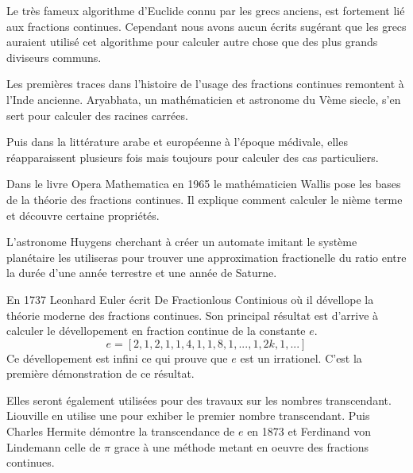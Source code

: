 Le très fameux algorithme d'Euclide connu par les grecs anciens, est fortement lié aux fractions continues. Cependant nous avons aucun écrits sugérant que les grecs auraient utilisé cet algorithme pour calculer autre chose que des plus grands diviseurs communs.\newline

Les premières traces dans l'histoire de l'usage des fractions continues remontent à l'Inde ancienne. Aryabhata, un mathématicien et astronome du Vème siecle, s'en sert pour calculer des racines carrées.\newline

Puis dans la littérature arabe et européenne à l'époque médivale, elles réapparaissent plusieurs fois mais toujours pour calculer des cas particuliers.\newline

Dans le livre Opera Mathematica en 1965 le mathématicien Wallis pose les bases de la théorie des fractions continues. Il explique comment calculer le nième terme et découvre certaine propriétés.\newline

L'astronome Huygens cherchant à créer un automate imitant le système planétaire les utiliseras pour trouver une approximation fractionelle du ratio entre la durée d'une année terrestre et une année de Saturne.\newline

En 1737 Leonhard Euler écrit De Fractionlous Continious où il dévellope la théorie moderne des fractions continues. Son principal résultat est d'arrive à calculer le dévellopement en fraction continue de la constante $e$. \[
e=[2,1,2,1,1,4,1,1,8,1,...,1,2k,1,...]
\]
Ce dévellopement est infini ce qui prouve que $e$ est un irrationel. C'est la première démonstration de ce résultat.\newline

Elles seront également utilisées pour des travaux sur les nombres transcendant. Liouville en utilise une pour exhiber le premier nombre transcendant. Puis Charles Hermite démontre la transcendance de $e$ en 1873 et Ferdinand von Lindemann celle de $\pi$ grace à une méthode metant en oeuvre des fractions continues. \newline%

